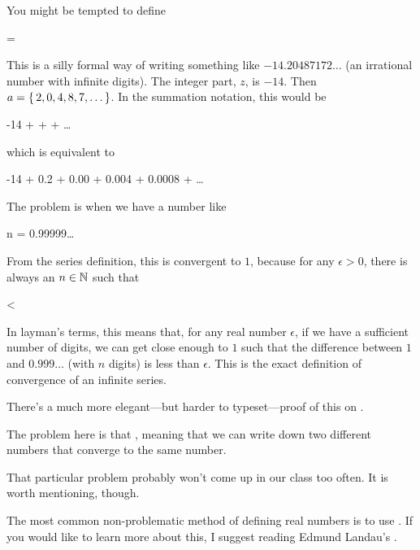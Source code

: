 \begin{aside}
  You might be tempted to define

  \begin{zz}
    \R = 
  \end{zz}

  This is a silly formal way of writing something like
  $-14.20487172\dots$ (an irrational number with infinite digits). The
  integer part, $z$, is $-14$. Then $a = \left\{ \, 2,0,4,8,7,\dots \, \right\}$. In
  the summation notation, this would be

  \begin{zz}
    -14 +  +  +
    \dots
  \end{zz}

  which is equivalent to

  \begin{zz}
    -14 + 0.2 + 0.00 + 0.004 + 0.0008 + \dots
  \end{zz}

  The problem is when we have a number like

  \begin{zz}
    n = 0.99999\dots
  \end{zz}

  From the series definition, this is convergent to $1$, because for
  any $\epsilon > 0$, there is always an $n \in \mathbb{N}$ such that

  \begin{zz}
     < \epsilon
  \end{zz}

  In layman's terms, this means that, for any real number $\epsilon$,
  if we have a sufficient number of digits, we can get close enough to
  $1$ such that the difference between $1$ and $0.999\dots$ (with $n$
  digits) is less than $\epsilon$. This is the exact definition of
  convergence of an infinite series. \cite{taylor}

  There's a much more elegant---but harder to typeset---proof of this
  on . \cite{pa-unique}

  The problem here is that , meaning that we can write down two
  different numbers that converge to the same number.

  That particular problem probably won't come up in our class too
  often. It is worth mentioning, though.

  The most common non-problematic method of defining real numbers is
  to use . If you would like to learn more about
  this, I suggest reading Edmund Landau's . \cite{landau}
\end{aside}

